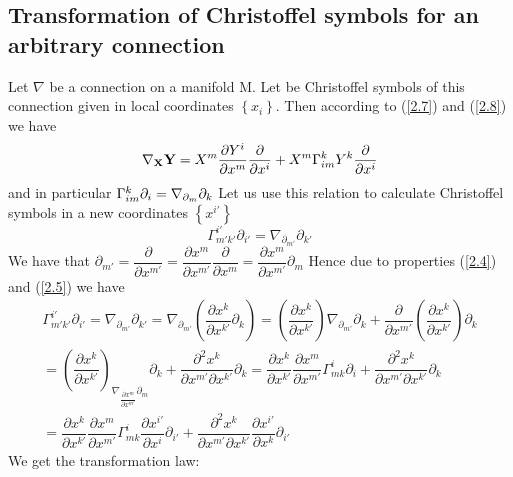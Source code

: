   \subsection{Transformation of Christoffel symbols for an arbitrary connection}
 Let $\nabla$ be a connection on a manifold M. Let {} be Christoffel symbols of this connection
 given in local coordinates $\left\lbrace x_i\right\rbrace$. Then according to (\ref{2.7}) and (\ref{2.8}) we have
 \begin{equation}
  \nabla_{\mathbf{X}}\mathbf{Y} = X^{m}\dfrac{\partial Y^{i}}{\partial x^{m}} \dfrac{\partial}{\partial x^{i}} +
  X^{m} \Gamma_{im}^{k} Y^{k} \dfrac{\partial}{\partial x^{i}}
 \end{equation}
and in particular 
$\Gamma_{im}^{k} \partial_i = \nabla_{\partial_{m}} \partial_k$
Let us use this relation to calculate Christoffel symbols in a new coordinates 
$\left\lbrace x^{i'} \right\rbrace$ 
\begin{equation*}
\Gamma_{m'k'}^{i'}\partial_{i'} = \nabla_{\partial_{m'}}\partial_{k'}
\end{equation*}
We have that $\partial_{m'} = \dfrac{\partial}{\partial x^{m'}}=
\dfrac{\partial x^{m}}{\partial x^{m'}}\dfrac{\partial}{\partial x^{m}} = \dfrac{\partial x^{m}}{\partial x^{m'}}\partial_m$
Hence due to properties (\ref{2.4}) and (\ref{2.5}) we have 
\begin{eqnarray*}
\Gamma_{m'k'}^{i'}\partial_{i'} = \nabla_{\partial_{m'}}\partial_{k'} = \nabla_{\partial_{m'}}\left(\dfrac{\partial x^{k}}
{\partial x^{k'}}\partial_{k}\right) = \left(\dfrac{\partial x^{k}}{\partial x^{k'}}\right)\nabla_{\partial_{m'}}\partial_k
+\dfrac{\partial}{\partial x^{m'}}\left(\dfrac{\partial x^{k}}{\partial x^{k'}}\right)\partial_k 
\\
= \left(\dfrac{\partial x^{k}}{\partial x^{k'}} \right)_{\nabla_{\dfrac{\partial x^{m}}{\partial x^{m'}}}\partial_{m}}\partial_k
+ \dfrac{\partial^{2} x^{k}}{\partial x^{m'}\partial x^{k'}}\partial_k
= \dfrac{\partial x^{k}}{\partial x^{k'}} \dfrac{\partial x^{m}}{\partial x^{m'}} \Gamma^{i}_{mk}\partial_{i}
+ \dfrac{\partial^{2}x^{k}}{\partial x^{m'} \partial x^{k'}}\partial_{k}
\\ = \dfrac{\partial x^{k}}{\partial x^{k'}}\dfrac{\partial x^{m}}{\partial x^{m'}} \Gamma^{i}_{mk} 
\dfrac{\partial x^{i'}}{\partial x^{i}}\partial_{i'} + 
\dfrac{\partial^{2} x^{k}}{\partial x^{m'} \partial x^{k'}} 
\dfrac{\partial x^{i'}}{\partial x^{k}}\partial_{i'}
\end{eqnarray*}
We get the transformation law: 
